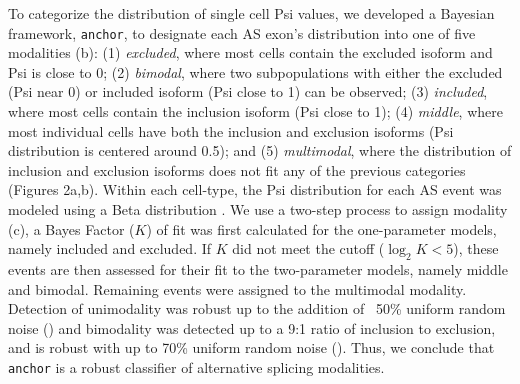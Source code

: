 To categorize the distribution of single cell Psi values, we developed a Bayesian framework, \texttt{anchor}, to designate each AS exon's distribution into one of five modalities (b): (1) \emph{excluded}, where most cells contain the excluded isoform and Psi is close to 0; (2) \emph{bimodal}, where two subpopulations with either the excluded (Psi near 0) or included isoform (Psi close to 1) can be observed; (3) \emph{included}, where most cells contain the inclusion isoform (Psi close to 1); (4) \emph{middle}, where most individual cells have both the inclusion and exclusion isoforms (Psi distribution is centered around 0.5); and (5) \emph{multimodal}, where the distribution of inclusion and exclusion isoforms does not fit any of the previous categories (Figures 2a,b). Within each cell-type, the Psi distribution for each AS event was modeled using a Beta distribution \cite{Barash2010}. We use a two-step process to assign modality (c), a Bayes Factor ($K$) of fit was first calculated for the one-parameter models, namely included and excluded. If $K$ did not meet the cutoff ($\log_2 K < 5$), these events are then assessed for their fit to the two-parameter models, namely middle and bimodal. Remaining events were assigned to the multimodal modality. Detection of unimodality was robust up to the addition of ~50\% uniform random noise () and bimodality was detected up to a 9:1 ratio of inclusion to exclusion, and is robust with up to 70\% uniform random noise (). Thus, we conclude that \texttt{anchor} is a robust classifier of alternative splicing modalities.


